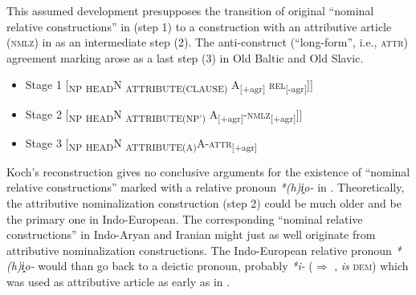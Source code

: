 This assumed development presupposes the transition of original “nominal relative constructions” in  (step 1) to a construction with an attributive article (\textsc{nmlz}) in  as an intermediate step (2). The anti\hyp{}construct (“long-form”, i.e., \textsc{attr}) agreement marking arose as a last step (3) in Old Baltic and Old Slavic.

\largerpage
\begin{itemize}
\item Stage 1 [\textsubscript{NP} \textsubscript{HEAD}N {\ob}\textsubscript{ATTRIBUTE(CLAUSE)} A\textsubscript{[+agr]} \textsc{rel}\textsubscript{[-agr]}{\upshape ]]}
\item Stage 2 [\textsubscript{NP} \textsubscript{HEAD}N {\ob}\textsubscript{ATTRIBUTE(NP')} A\textsubscript{[+agr]}-\textsc{nmlz}\textsubscript{[+agr]}{\upshape ]]}\item Stage 3 [\textsubscript{NP} \textsubscript{HEAD}N \textsubscript{ATTRIBUTE(A)}A-\textsc{attr}\textsubscript{[+agr]}{\cb}
\end{itemize}

Koch's reconstruction gives no conclusive arguments for the existence of “nominal relative constructions” marked with a relative pronoun \textit{*(h)i̭o-} in . Theoretically, the attributive nominalization construction (step 2) could be much older and be the primary one in Indo-European. The corresponding “nominal relative constructions” in Indo-Aryan and Iranian might just as well originate from attributive nominalization constructions. The Indo-European relative pronoun \textit{*(h)i̭o-} would than go back to a deictic pronoun, probably \textit{*i-} ($\Rightarrow$ ,  \textit{is} \textsc{dem}) which was used as attributive article as early as in .


